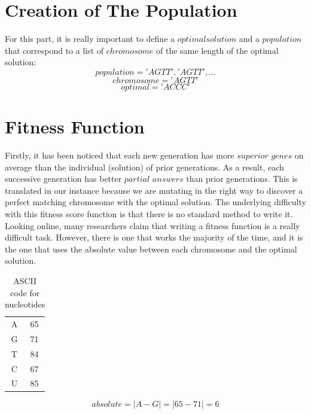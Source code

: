 \documentclass[letterpaper]{article} %
\begin{document}
\section{Creation of The Population}
For this part, it is really important to define a $optimal solution$ and a $population$ that correspond to a list of $chromosome$ of the same length of the optimal solution:
\[population = {'AGTT', 'AGTT', ...}\]
\[chromosome = {'AGTT'}\]
\[optimal = {'ACCC'}\]

\section{Fitness Function}
Firstly, it has been noticed that each new generation has more $superior$ $genes$ on average than the individual (solution) of prior generations. As a result, each successive generation has better $partial$ $answers$ than prior generations. This is translated in our instance because we are mutating in the right way to discover a perfect matching chromosome with the optimal solution. The underlying difficulty with this fitness score function is that there is no standard method to write it.
Looking online, many researchers claim that writing a fitness function is a really difficult task. However, there is one that works the majority of the time, and it is the one that uses the absolute value between each chromosome and the optimal solution.\\
\begin{table}[h]
    \centering
    \begin{tabular}{c|c}
         A & 65 \\
         G & 71\\
         T & 84 \\
         C & 67 \\
         U & 85
    \end{tabular}
    \caption{ASCII code for nucleotides}
    \label{tab:my_label}
\end{table}
\[ absolute = |A - G| = |65 - 71| = 6 \]
\end{document}
